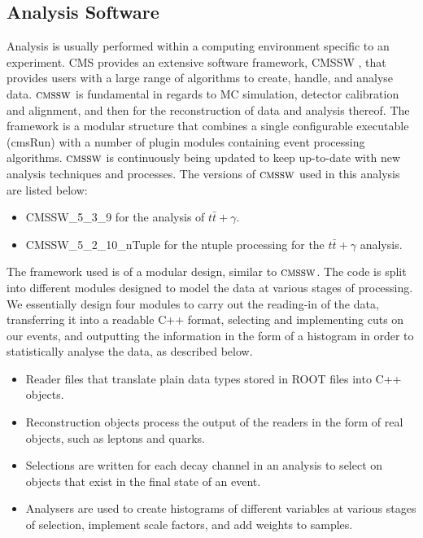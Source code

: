 \subsection{Analysis Software} \label{subsec-AnalysisSoftware}

Analysis is usually performed within a computing environment specific to an experiment. CMS provides an extensive software framework, CMSSW \cite{CMSSW}, that provides users with a large range of algorithms to create, handle, and analyse data. ${\textsc{cmssw}}$ is fundamental in regards to MC simulation, detector calibration and alignment, and then for the reconstruction of data and analysis thereof. The framework is a modular structure that combines a single configurable executable (cmsRun) with a number of plugin modules containing event processing algorithms. ${\textsc{cmssw}}$ is continuously being updated to keep up-to-date with new analysis techniques and processes. The versions of ${\textsc{cmssw}}$ used in this analysis are listed below:

\begin{itemize}
	\item CMSSW\_5\_3\_9 for the analysis of $t\bar{t}+\gamma$.
	\item CMSSW\_5\_2\_10\_nTuple for the ntuple processing for the $t\bar{t}+\gamma$ analysis.
\end{itemize} 

The framework used is of a modular design, similar to ${\textsc{cmssw}}$. The code is split into different modules designed to model the data at various stages of processing. We essentially design four modules to carry out the reading-in of the data, transferring it into a readable C++ format, selecting and implementing cuts on our events, and outputting the information in the form of a histogram in order to statistically analyse the data, as described below. 

\begin{itemize}
	\item Reader files that translate plain data types stored in ROOT files into C++ objects. 
	\item Reconstruction objects process the output of the readers in the form of real objects, such as leptons and quarks.
	\item Selections are written for each decay channel in an analysis to select on objects that exist in the final state of an event.
	\item Analysers are used to create histograms of different variables at various stages of selection, implement scale factors, and add weights to samples. 
\end{itemize}

